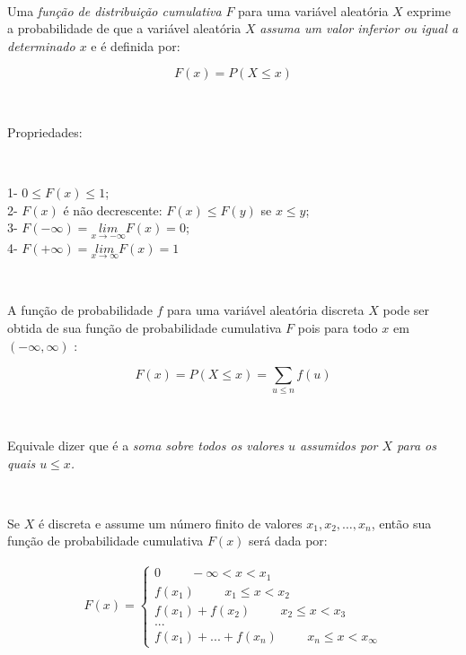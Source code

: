 \documentclass[
]{book}
\begin{document}
~

Uma \emph{função de distribuição cumulativa} \(F\) para uma variável aleatória \(X\) exprime a probabilidade de que a variável aleatória \(X\) \emph{assuma um valor inferior ou igual a determinado \(x\)} e é definida por:

\hfill\break

\[
F(x) = P(X \leq x)
\]

~

Propriedades:

~

1- \(0 \leq F(x) \leq 1\);\\
2- \(F(x)\) é não decrescente: \(F(x) \leq F(y)\) se \(x \leq y\);\\
3- \(F(- \infty) = \underset{x\to -\infty }{lim}F\left(x\right)=0\);\\
4- \(F(+ \infty) = \underset{x\to \infty }{lim}F\left(x\right)=1\)

~

A função de probabilidade \(f\) para uma variável aleatória discreta \(X\) pode ser obtida de sua função de probabilidade cumulativa \(F\) pois para todo \(x\) em \((-\infty, \infty)\) :

\hfill\break

\[
F\left(x\right)=P\left(X\le x\right)=\sum _{u\le n}f\left(u\right)
\]

~

Equivale dizer que é a \emph{soma sobre todos os valores \(u\) assumidos por \(X\) para os quais \(u \leq x\).}

~

Se \(X\) é discreta e assume um número finito de valores \(x_{1},x_{2}, \dots, x_{n}\), então sua função de probabilidade cumulativa \(F(x)\) será dada por:

\hfill\break

\begin{align}   
F(x)=
\begin{cases}
        0 \hspace{1cm} -\infty < x < x_{1} \\
        f(x_{1}) \hspace{1cm} x_{1} \leq x <  x_{2}  \\
        f(x_{1}) + f(x_{2}) \hspace{1cm} x_{2} \leq x <  x_{3}  \\
        ...                    \\
        f(x_{1}) + ...+ f(x_{n}) \hspace{1cm} x_{n} \leq x <  x_{\infty}
\end{cases}
\end{align}
\end{document}
